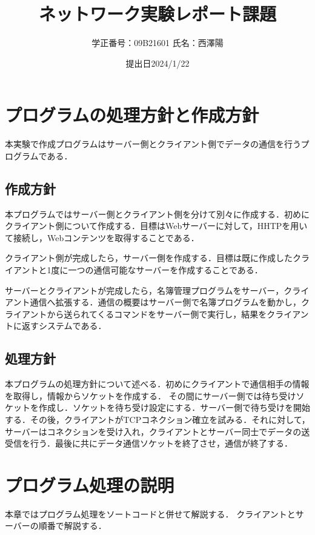 \documentclass[11pt,a4j,titlepage]{jsarticle}
\begin{document}
\title{ネットワーク実験レポート課題}
\author{学正番号：09B21601 氏名：西澤陽}
\date{提出日2024/1/22}
\maketitle
\section{プログラムの処理方針と作成方針}
本実験で作成プログラムはサーバー側とクライアント側でデータの通信を行うプログラムである．
\subsection{作成方針}
本プログラムではサーバー側とクライアント側を分けて別々に作成する．初めにクライアント側について作成する．目標はWebサーバーに対して，HHTPを用いて接続し，Webコンテンツを取得することである．

クライアント側が完成したら，サーバー側を作成する．目標は既に作成したクライアントと1度に一つの通信可能なサーバーを作成することである．

サーバーとクライアントが完成したら，名簿管理プログラムをサーバー，クライアント通信へ拡張する．通信の概要はサーバー側で名簿プログラムを動かし，クライアントから送られてくるコマンドをサーバー側で実行し，結果をクライアントに返すシステムである．
\subsection{処理方針}\label{shorihou}
本プログラムの処理方針について述べる．初めにクライアントで通信相手の情報を取得し，情報からソケットを作成する．
その間にサーバー側では待ち受けソケットを作成し．ソケットを待ち受け設定にする．サーバー側で待ち受けを開始する．その後，クライアントがTCPコネクション確立を試みる．それに対して，サーバーはコネクションを受け入れ，クライアントとサーバー同士でデータの送受信を行う．最後に共にデータ通信ソケットを終了させ，通信が終了する．

\section{プログラム処理の説明}
本章ではプログラム処理をソートコードと併せて解説する．
クライアントとサーバーの順番で解説する．
\end{document}
